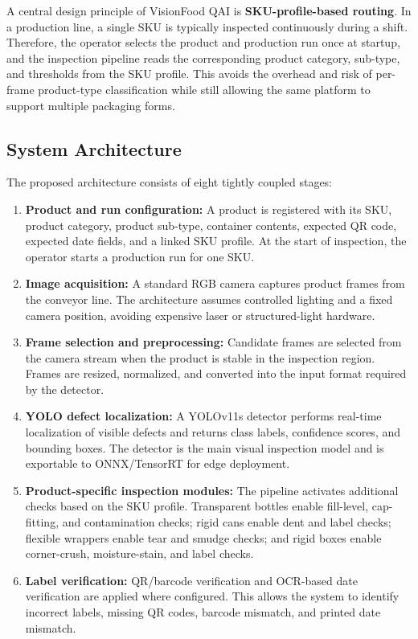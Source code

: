 \documentclass{ieeeaccess}
\begin{document}
A central design principle of VisionFood QAI is \textbf{SKU-profile-based routing}. In a production line, a single SKU is typically inspected continuously during a shift. Therefore, the operator selects the product and production run once at startup, and the inspection pipeline reads the corresponding product category, sub-type, and thresholds from the SKU profile. This avoids the overhead and risk of per-frame product-type classification while still allowing the same platform to support multiple packaging forms.

\subsection{System Architecture}
The proposed architecture consists of eight tightly coupled stages:

\begin{enumerate}
    \item \textbf{Product and run configuration:} A product is registered with its SKU, product category, product sub-type, container contents, expected QR code, expected date fields, and a linked SKU profile. At the start of inspection, the operator starts a production run for one SKU.
    \item \textbf{Image acquisition:} A standard RGB camera captures product frames from the conveyor line. The architecture assumes controlled lighting and a fixed camera position, avoiding expensive laser or structured-light hardware.
    \item \textbf{Frame selection and preprocessing:} Candidate frames are selected from the camera stream when the product is stable in the inspection region. Frames are resized, normalized, and converted into the input format required by the detector.
    \item \textbf{YOLO defect localization:} A YOLOv11s detector performs real-time localization of visible defects and returns class labels, confidence scores, and bounding boxes. The detector is the main visual inspection model and is exportable to ONNX/TensorRT for edge deployment.
    \item \textbf{Product-specific inspection modules:} The pipeline activates additional checks based on the SKU profile. Transparent bottles enable fill-level, cap-fitting, and contamination checks; rigid cans enable dent and label checks; flexible wrappers enable tear and smudge checks; and rigid boxes enable corner-crush, moisture-stain, and label checks.
    \item \textbf{Label verification:} QR/barcode verification and OCR-based date verification are applied where configured. This allows the system to identify incorrect labels, missing QR codes, barcode mismatch, and printed date mismatch.

\end{enumerate}
\end{document}
